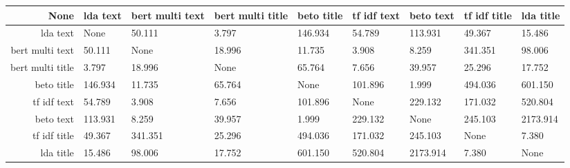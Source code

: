\begin{tabular}{|r|l|l|l|l|l|l|l|l|}
  \hline
  None & lda text & bert multi text & bert multi title & beto title & tf idf text & beto text & tf idf title & lda title \\ 
  \hline
  lda text & None & 50.111 & 3.797 & 146.934 & 54.789 & 113.931 & 49.367 & 15.486 \\ 
  \hline
  bert multi text & 50.111 & None & 18.996 & 11.735 & 3.908 & 8.259 & 341.351 & 98.006 \\ 
  \hline
  bert multi title & 3.797 & 18.996 & None & 65.764 & 7.656 & 39.957 & 25.296 & 17.752 \\ 
  \hline
  beto title & 146.934 & 11.735 & 65.764 & None & 101.896 & 1.999 & 494.036 & 601.150 \\ 
  \hline
  tf idf text & 54.789 & 3.908 & 7.656 & 101.896 & None & 229.132 & 171.032 & 520.804 \\ 
  \hline
  beto text & 113.931 & 8.259 & 39.957 & 1.999 & 229.132 & None & 245.103 & 2173.914 \\ 
  \hline
  tf idf title & 49.367 & 341.351 & 25.296 & 494.036 & 171.032 & 245.103 & None & 7.380 \\ 
  \hline
  lda title & 15.486 & 98.006 & 17.752 & 601.150 & 520.804 & 2173.914 & 7.380 & None \\ 
  \hline
\end{tabular}
